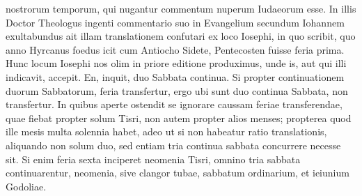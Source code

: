 nostrorum temporum, qui nugantur commentum nuperum
Iudaeorum esse.
In illis Doctor Theologus ingenti commentario
suo in Evangelium secundum Iohannem exultabundus ait illam
translationem confutari ex loco Iosephi, in quo scribit, quo anno
Hyrcanus foedus icit cum Antiocho Sidete, Pentecosten fuisse feria
prima.
Hunc locum Iosephi nos olim in priore editione produximus,
unde is, aut qui illi indicavit, accepit.
En, inquit, duo Sabbata continua.
Si propter continuationem duorum Sabbatorum, feria transfertur,
ergo ubi sunt duo continua Sabbata, non transfertur. 
In quibus
aperte ostendit se ignorare caussam feriae transferendae, quae fiebat
propter solum Tisri, non autem propter alios menses; propterea
quod ille mesis multa solennia habet, adeo ut si non habeatur
ratio translationis, aliquando non solum duo, sed entiam tria continua
sabbata concurrere necesse sit.
Si enim feria sexta inciperet
neomenia Tisri, omnino tria sabbata continuarentur, neomenia,
sive clangor tubae, sabbatum ordinarium, et ieiunium Godoliae.

